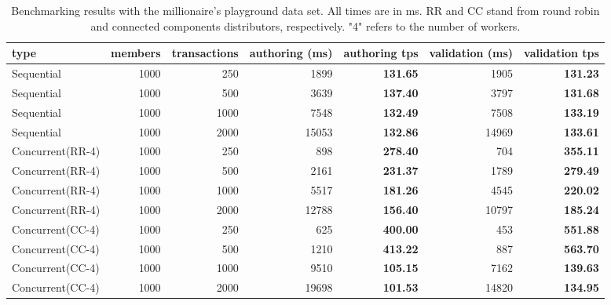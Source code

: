 \begin{table}[h]
\centering
\caption{Benchmarking results with the millionaire's playground data set. All times are in ms. RR and CC stand from round robin and connected components distributors, respectively. "4" refers to the number of workers.}
\label{table:bench1}
\resizebox{\textwidth}{!} {
    \begin{tabular}{l|rr|rr|rr}
    \textbf{type}    & \textbf{members} & \textbf{transactions} & \textbf{authoring (ms)} & authoring tps   & \textbf{validation (ms)} & validation tps  \\ \hline
    Sequential       & 1000             & 250                   & 1899                    & \textbf{131.65} & 1905                     & \textbf{131.23} \\
    Sequential       & 1000             & 500                   & 3639                    & \textbf{137.40} & 3797                     & \textbf{131.68} \\
    Sequential       & 1000             & 1000                  & 7548                    & \textbf{132.49} & 7508                     & \textbf{133.19} \\
    Sequential       & 1000             & 2000                  & 15053                   & \textbf{132.86} & 14969                    & \textbf{133.61} \\ \hline
    Concurrent(RR-4) & 1000             & 250                   & 898                     & \textbf{278.40} & 704                      & \textbf{355.11} \\
    Concurrent(RR-4) & 1000             & 500                   & 2161                    & \textbf{231.37} & 1789                     & \textbf{279.49} \\
    Concurrent(RR-4) & 1000             & 1000                  & 5517                    & \textbf{181.26} & 4545                     & \textbf{220.02} \\
    Concurrent(RR-4) & 1000             & 2000                  & 12788                   & \textbf{156.40} & 10797                    & \textbf{185.24} \\ \hline
    Concurrent(CC-4) & 1000             & 250                   & 625                     & \textbf{400.00} & 453                      & \textbf{551.88} \\
    Concurrent(CC-4) & 1000             & 500                   & 1210                    & \textbf{413.22} & 887                      & \textbf{563.70} \\
    Concurrent(CC-4) & 1000             & 1000                  & 9510                    & \textbf{105.15} & 7162                     & \textbf{139.63} \\
    Concurrent(CC-4) & 1000             & 2000                  & 19698                   & \textbf{101.53} & 14820                    & \textbf{134.95}
    \end{tabular}
}
\end{table}


